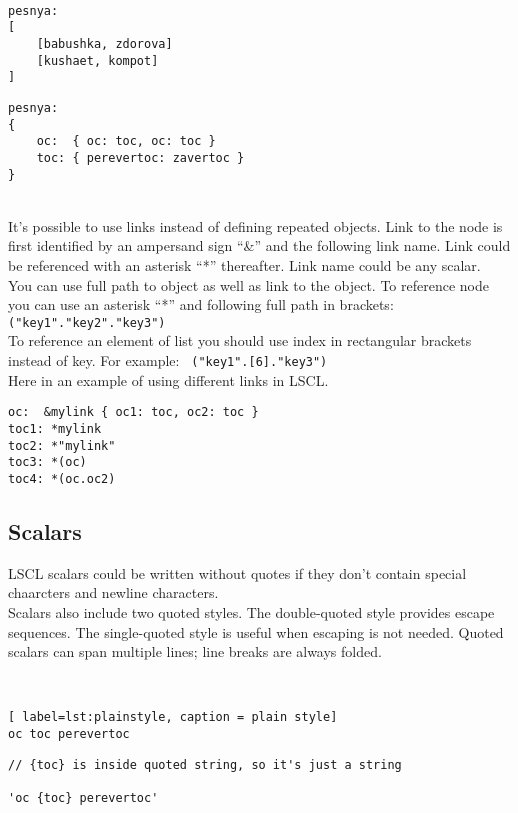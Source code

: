 ~\\
\begin{minipage}{0.45\textwidth}
\begin{lstlisting}[caption = list of lists]
pesnya:
[
	[babushka, zdorova]
	[kushaet, kompot]
]
\end{lstlisting}
\end{minipage}
\hfill
\begin{minipage}{0.45\textwidth}
\begin{lstlisting}[caption = map of maps]
pesnya:
{
	oc:  { oc: toc, oc: toc }
	toc: { perevertoc: zavertoc }
}
\end{lstlisting}
\end{minipage}
~\\
It's possible to use links instead of defining repeated objects. Link to the node is first identified by an ampersand sign ``\&'' and the following link name. Link could be referenced with an asterisk ``*'' thereafter. Link name could be any scalar. \\
You can use full path to object as well as link to the object. To reference node you can use an asterisk ``*'' and following full path in brackets: \texttt{ \Large*("key1"."key2"."key3")} \\
To reference an element of list you should use index in rectangular brackets instead of key.
For example: \texttt{ \Large*("key1".[6]."key3")} \\
Here in an example of using different links in LSCL.
\begin{lstlisting}[caption = using links]
oc:  &mylink { oc1: toc, oc2: toc }
toc1: *mylink
toc2: *"mylink"
toc3: *(oc)
toc4: *(oc.oc2)
\end{lstlisting}

\subsection{Scalars}
LSCL scalars could be written without quotes if they don't contain special chaarcters and newline characters. \\
Scalars also include two quoted styles. The double-quoted style provides escape sequences. The single-quoted style is useful when escaping is not needed. Quoted scalars can span multiple lines; line breaks are always folded.

~\\
\begin{minipage}{0.45\textwidth}
\begin{lstlisting}[ label=lst:plainstyle, caption = plain style]
oc toc perevertoc
\end{lstlisting}
\end{minipage}
\hfill
\begin{minipage}{0.45\textwidth}
\begin{lstlisting}[caption = single-quoted style]
// {toc} is inside quoted string, so it's just a string

'oc {toc} perevertoc'
\end{lstlisting}
\end{minipage}

